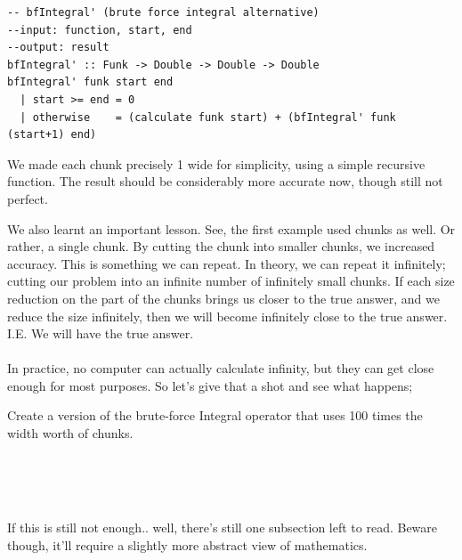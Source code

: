 \begin{verbatim}
-- bfIntegral' (brute force integral alternative)
--input: function, start, end
--output: result
bfIntegral' :: Funk -> Double -> Double -> Double
bfIntegral' funk start end
  | start >= end = 0
  | otherwise    = (calculate funk start) + (bfIntegral' funk (start+1) end)
\end{verbatim}
We made each chunk precisely 1 wide for simplicity, using a simple recursive function. The result should be considerably more accurate now, though still not perfect.

We also learnt an important lesson. See, the first example used chunks as well. Or rather, a single chunk. By cutting the chunk into smaller chunks, we increased accuracy. This is something we can repeat. In theory, we can repeat it infinitely; cutting our problem into an infinite number of infinitely small chunks. If each size reduction on the part of the chunks brings us closer to the true answer, and we reduce the size infinitely, then we will become infinitely close to the true answer. I.E. We will have the true answer.

\paragraph{} In practice, no computer can actually calculate infinity, but they can get close enough for most purposes. So let's give that a shot and see what happens;
\begin{exercise}
Create a version of the brute-force Integral operator that uses 100 times the width worth of chunks.

\\
\\
\\
\end{exercise}

 If this is still not enough.. well, there's still one subsection left to read. Beware though, it'll require a slightly more abstract view of mathematics.

